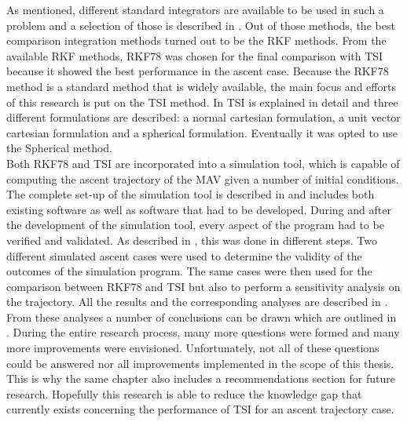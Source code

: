 As mentioned, different standard integrators are available to be used in such a problem and a selection of those is described in . Out of those methods, the best comparison integration methods turned out to be the \ac{RKF} methods. From the available \ac{RKF} methods, \acf{RKF78} was chosen for the final comparison with \ac{TSI} because it showed the best performance in the ascent case. 
Because the \ac{RKF78} method is a standard method that is widely available, the main focus and efforts of this research is put on the \ac{TSI} method. In  \ac{TSI} is explained in detail and three different formulations are described: a normal cartesian formulation, a unit vector cartesian formulation and a spherical formulation. Eventually it was opted to use the Spherical method. \\

Both \ac{RKF78} and \ac{TSI} are incorporated into a simulation tool, which is capable of computing the ascent trajectory of the \ac{MAV} given a number of initial conditions. The complete set-up of the simulation tool is described in  and includes both existing software as well as software that had to be developed. 
During and after the development of the simulation tool, every aspect of the program had to be verified and validated. As described in , this was done in different steps. Two different simulated ascent cases were used to determine the validity of the outcomes of the simulation program.
The same cases were then used for the comparison between \ac{RKF78} and \ac{TSI} but also to perform a sensitivity analysis on the trajectory. All the results and the corresponding analyses are described in .
From these analyses a number of conclusions can be drawn which are outlined in . During the entire research process, many more questions were formed and many more improvements were envisioned. Unfortunately, not all of these questions could be answered nor all improvements implemented in the scope of this thesis. This is why the same chapter also includes a recommendations section for future research. 
Hopefully this research is able to reduce the knowledge gap that currently exists concerning the performance of \ac{TSI} for an ascent trajectory case.





